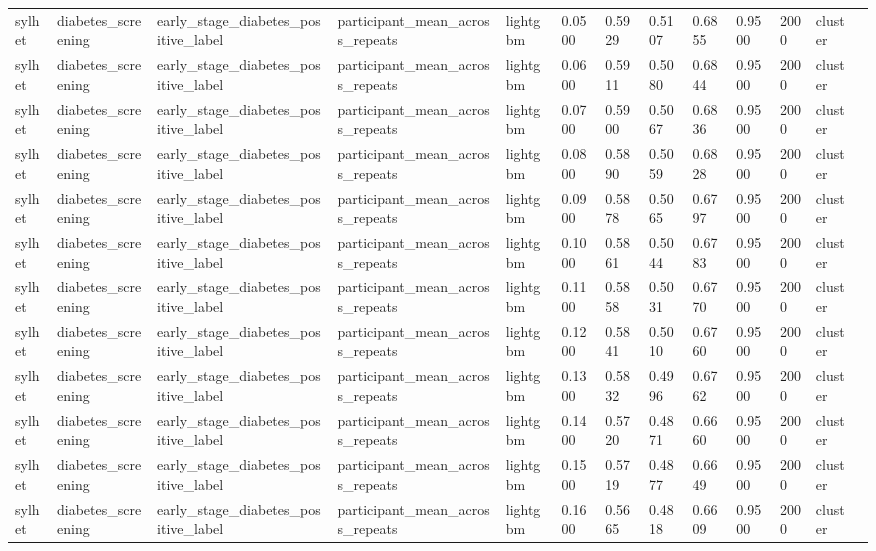 \begin{tabular}{lllllllllllll}
sylhet & diabetes\_screening & early\_stage\_diabetes\_positive\_label & participant\_mean\_across\_repeats & lightgbm & 0.0500 & 0.5929 & 0.5107 & 0.6855 & 0.9500 & 2000 & cluster &  \\
sylhet & diabetes\_screening & early\_stage\_diabetes\_positive\_label & participant\_mean\_across\_repeats & lightgbm & 0.0600 & 0.5911 & 0.5080 & 0.6844 & 0.9500 & 2000 & cluster &  \\
sylhet & diabetes\_screening & early\_stage\_diabetes\_positive\_label & participant\_mean\_across\_repeats & lightgbm & 0.0700 & 0.5900 & 0.5067 & 0.6836 & 0.9500 & 2000 & cluster &  \\
sylhet & diabetes\_screening & early\_stage\_diabetes\_positive\_label & participant\_mean\_across\_repeats & lightgbm & 0.0800 & 0.5890 & 0.5059 & 0.6828 & 0.9500 & 2000 & cluster &  \\
sylhet & diabetes\_screening & early\_stage\_diabetes\_positive\_label & participant\_mean\_across\_repeats & lightgbm & 0.0900 & 0.5878 & 0.5065 & 0.6797 & 0.9500 & 2000 & cluster &  \\
sylhet & diabetes\_screening & early\_stage\_diabetes\_positive\_label & participant\_mean\_across\_repeats & lightgbm & 0.1000 & 0.5861 & 0.5044 & 0.6783 & 0.9500 & 2000 & cluster &  \\
sylhet & diabetes\_screening & early\_stage\_diabetes\_positive\_label & participant\_mean\_across\_repeats & lightgbm & 0.1100 & 0.5858 & 0.5031 & 0.6770 & 0.9500 & 2000 & cluster &  \\
sylhet & diabetes\_screening & early\_stage\_diabetes\_positive\_label & participant\_mean\_across\_repeats & lightgbm & 0.1200 & 0.5841 & 0.5010 & 0.6760 & 0.9500 & 2000 & cluster &  \\
sylhet & diabetes\_screening & early\_stage\_diabetes\_positive\_label & participant\_mean\_across\_repeats & lightgbm & 0.1300 & 0.5832 & 0.4996 & 0.6762 & 0.9500 & 2000 & cluster &  \\
sylhet & diabetes\_screening & early\_stage\_diabetes\_positive\_label & participant\_mean\_across\_repeats & lightgbm & 0.1400 & 0.5720 & 0.4871 & 0.6660 & 0.9500 & 2000 & cluster &  \\
sylhet & diabetes\_screening & early\_stage\_diabetes\_positive\_label & participant\_mean\_across\_repeats & lightgbm & 0.1500 & 0.5719 & 0.4877 & 0.6649 & 0.9500 & 2000 & cluster &  \\
sylhet & diabetes\_screening & early\_stage\_diabetes\_positive\_label & participant\_mean\_across\_repeats & lightgbm & 0.1600 & 0.5665 & 0.4818 & 0.6609 & 0.9500 & 2000 & cluster &  \\

\end{tabular}
